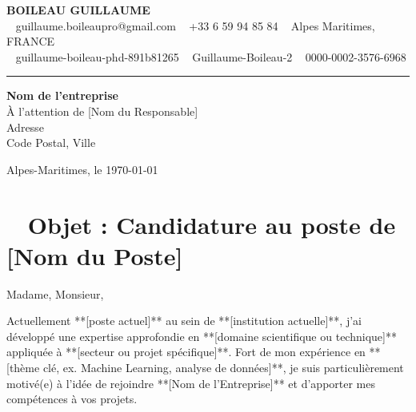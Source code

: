 \documentclass[a4paper,10pt]{article}
\begin{document}
\begin{center}
    {\Huge \textbf{\textcolor{name}{BOILEAU GUILLAUME}}}\\
    \vspace{0.3cm}
    \textcolor{body}{\faEnvelope ~ guillaume.boileaupro@gmail.com \quad \faPhone* ~ +33 6 59 94 85 84 \quad \faMapMarker* ~ Alpes Maritimes, FRANCE} \\
    \textcolor{body}{\faLinkedin ~ guillaume-boileau-phd-891b81265 \quad \faGithub ~ Guillaume-Boileau-2 \quad \faOrcid ~ 0000-0002-3576-6968}
    \color{headingrule}\rule{0.9\textwidth}{0.5pt}
\end{center}

\vspace{0.5cm}

\begin{minipage}{0.6\textwidth}
    \textbf{\textcolor{heading}{Nom de l'entreprise}} \\
    À l'attention de [Nom du Responsable] \\
    Adresse \\
    Code Postal, Ville \\
\end{minipage}
\hfill
\begin{minipage}{0.3\textwidth}
    \flushright
    \textcolor{body}{Alpes-Maritimes, le \today}
\end{minipage}

\vspace{0.8cm}

\section*{\textcolor{accent}{\faPencil} ~ \textcolor{heading}{Objet : Candidature au poste de [Nom du Poste]}}

Madame, Monsieur, \\

\vspace{0.3cm}

Actuellement **[poste actuel]** au sein de **[institution actuelle]**, j’ai développé une expertise approfondie en **[domaine scientifique ou technique]** appliquée à **[secteur ou projet spécifique]**. Fort de mon expérience en **[thème clé, ex. Machine Learning, analyse de données]**, je suis particulièrement motivé(e) à l’idée de rejoindre **[Nom de l'Entreprise]** et d’apporter mes compétences à vos projets.
\end{document}
